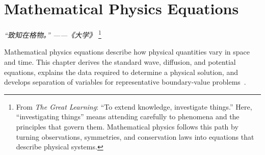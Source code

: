 \chapter{Mathematical Physics Equations}
\renewcommand{\currentchapterpath}{chapters/pde/}

\begin{flushright}
\textit{“致知在格物。” ——《大学》}
\footnote{From \textit{The Great Learning}: 
``To extend knowledge, investigate things.'' Here, ``investigating 
things'' means attending carefully to phenomena and the principles that
 govern them. Mathematical physics follows this path by turning 
 observations, symmetries, and conservation laws into equations 
 that describe physical systems.}
\end{flushright}

Mathematical physics equations describe how physical quantities vary in space and time. This chapter derives the standard wave, diffusion, and potential equations, explains the data required to determine a physical solution, and develops separation of variables for representative boundary-value problems~\cite{strauss,tikhonov,courant}.

